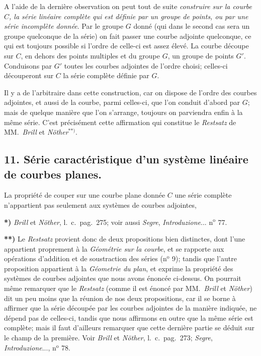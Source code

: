 \documentclass{article}
\begin{document}
A l'aide de la dernière observation on peut tout de suite \emph{construire sur la courbe $C$, la série linéaire complète qui est définie par un groupe de points, ou par une série incomplète donnée}. Par le groupe $G$ donné (qui dans le second cas sera un groupe quelconque de la série) on fait passer une courbe adjointe quelconque, ce qui est toujours possible si l'ordre de celle-ci est assez élevé. La courbe découpe sur $C$, en dehors des points multiples et du groupe $G$, un groupe de points $G'$. Conduisons par $G'$ toutes les courbes adjointes de l'ordre choisi; celles-ci découperont sur $C$ la série complète définie par $G$.

Il y a de l'arbitraire dans cette construction, car on dispose de l'ordre des courbes adjointes, et aussi de la courbe, parmi celles-ci, que l'on conduit d'abord par $G$; mais de quelque manière que l'on s'arrange, toujours on parviendra enfin à la même série. C'est précisément cette affirmation qui constitue le \emph{Restsatz} de MM.\ \emph{Brill} et \emph{Nöther}${}^{**)}$.

\subsection*{11. Série caractéristique d'un système linéaire de courbes planes.}

La propriété de couper sur une courbe plane donnée $C$ une série complète n'appartient pas seulement aux systèmes de courbes adjointes,

\textbf{*)} \emph{Brill} et \emph{Nöther}, l.\ c.\ pag.\ 275; voir aussi \emph{Segre}, \emph{Introduzione}... n${}^{\text{o}}$ 77.

\textbf{**)} Le \emph{Restsatz} provient donc de deux propositions bien distinctes, dont l'une appartient proprement à la \emph{Géométrie sur la courbe}, et se rapporte aux opérations d'addition et de soustraction des séries (n${}^{\text{o}}$ 9); tandis que l'autre proposition appartient à la \emph{Géometrie du plan}, et exprime la propriété des systèmes de courbes adjointes que nous avons énoncée ci-dessus. On pourrait même remarquer que le \emph{Restsatz} (comme il est énoncé par MM.\ \emph{Brill} et \emph{Nöther}) dit un peu moins que la réunion de nos deux propositions, car il se borne à affirmer que la série découpée par les courbes adjointes de la manière indiquée, ne dépend pas de celles-ci, tandis que nous affirmons en outre que la même série est complète; mais il faut d'ailleurs remarquer que cette dernière partie se déduit sur le champ de la première. Voir \emph{Brill} et \emph{Nöther}, l.\ c.\ pag.\ 273; \emph{Segre}, \emph{Introduzione}..., n${}^{\text{o}}$ 78.
\end{document}

